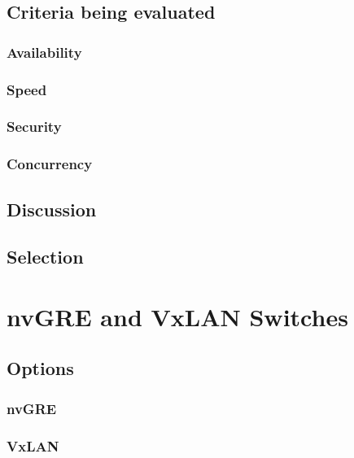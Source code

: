 \documentclass[10pt,letterpaper,onecolumn,draftclsnofoot]{IEEEtran}
\begin{document}
\subsection{Criteria being evaluated}

\subsubsection{Availability}

\subsubsection{Speed}

\subsubsection{Security}

\subsubsection{Concurrency}

\subsection{Discussion}

\subsection{Selection}


\section{nvGRE and VxLAN Switches}

\subsection{Options}

\subsubsection{nvGRE}

\subsubsection{VxLAN}

\subsubsection{}
\end{document}
